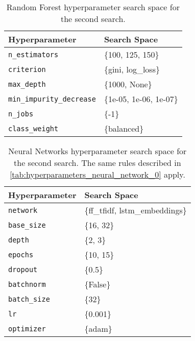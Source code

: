 \begin{table}[H]
\centering
\begin{tabularx}{0.48\textwidth}{|l|X|}
\hline
Hyperparameter & Search Space \\
\hline
\texttt{n\_estimators} & \{100, 125, 150\} \\
\texttt{criterion} & \{gini, log\_loss\} \\
\texttt{max\_depth} & \{1000, None\} \\
\texttt{min\_impurity\_decrease} & \{1e-05, 1e-06, 1e-07\} \\
\texttt{n\_jobs} & \{-1\} \\
\texttt{class\_weight} & \{balanced\} \\
\hline
\end{tabularx}
\caption{Random Forest hyperparameter search space for the second search.}
\label{tab:hyperparameters_random_forest_1}

\end{table}


\begin{table}[H]
\centering
\begin{tabularx}{0.48\textwidth}{|l|X|}
\hline
Hyperparameter & Search Space \\
\hline
\texttt{network} & \{ff\_tfidf, lstm\_embeddings\} \\
\texttt{base\_size} & \{16, 32\} \\
\texttt{depth} & \{2, 3\} \\
\texttt{epochs} & \{10, 15\} \\
\texttt{dropout} & \{0.5\} \\
\texttt{batchnorm} & \{False\} \\
\texttt{batch\_size} & \{32\} \\
\texttt{lr} & \{0.001\} \\
\texttt{optimizer} & \{adam\} \\
\hline
\end{tabularx}
\caption{Neural Networks hyperparameter search space for the second search. The same rules described in \autoref{tab:hyperparameters_neural_network_0} apply.}
\label{tab:hyperparameters_neural_network_1}

\end{table}


